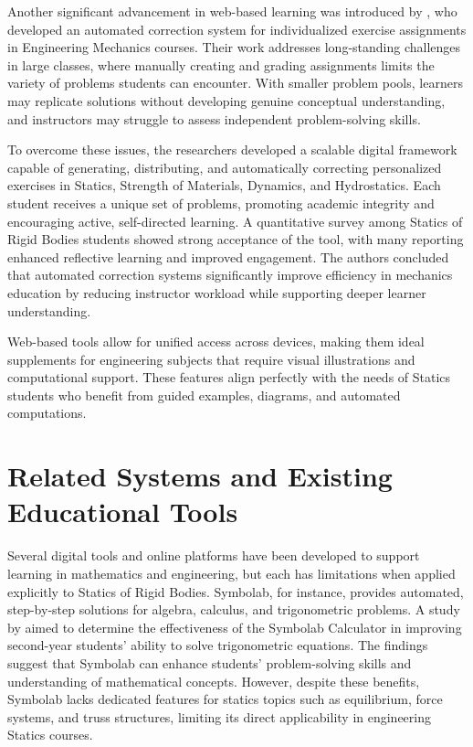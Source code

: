 Another significant advancement in web-based learning was introduced by \cite{gfrerer_teaching_2023}, who developed an automated correction system for individualized exercise assignments in Engineering Mechanics courses. Their work addresses long-standing challenges in large classes, where manually creating and grading assignments limits the variety of problems students can encounter. With smaller problem pools, learners may replicate solutions without developing genuine conceptual understanding, and instructors may struggle to assess independent problem-solving skills.

To overcome these issues, the researchers developed a scalable digital framework capable of generating, distributing, and automatically correcting personalized exercises in Statics, Strength of Materials, Dynamics, and Hydrostatics. Each student receives a unique set of problems, promoting academic integrity and encouraging active, self-directed learning. A quantitative survey among Statics of Rigid Bodies students showed strong acceptance of the tool, with many reporting enhanced reflective learning and improved engagement. The authors concluded that automated correction systems significantly improve efficiency in mechanics education by reducing instructor workload while supporting deeper learner understanding.

Web-based tools allow for unified access across devices, making them ideal supplements for engineering subjects that require visual illustrations and computational support. These features align perfectly with the needs of Statics students who benefit from guided examples, diagrams, and automated computations.





\section{Related Systems and Existing Educational Tools}

Several digital tools and online platforms have been developed to support learning in mathematics and engineering, but each has limitations when applied explicitly to Statics of Rigid Bodies. Symbolab, for instance, provides automated, step-by-step solutions for algebra, calculus, and trigonometric problems. A study by \cite{paulin_effectiveness_2024} aimed to determine the effectiveness of the Symbolab Calculator in improving second-year students’ ability to solve trigonometric equations. The findings suggest that Symbolab can enhance students’ problem-solving skills and understanding of mathematical concepts. However, despite these benefits, Symbolab lacks dedicated features for statics topics such as equilibrium, force systems, and truss structures, limiting its direct applicability in engineering Statics courses.

